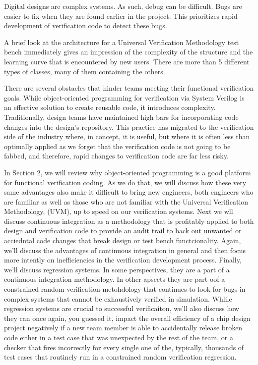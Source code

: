 \documentclass[twocolumn,letterpaper]{IEEEAerospaceCLS}  %
\begin{document}
Digital designs are complex systems. As such, debug can be difficult. Bugs are easier to fix when they are found earlier in the project. This prioritizes rapid development of verification code to detect these bugs.

A brief look at the architecture for a Universal Verification Methodology test bench immediately gives an impression of the complexity of the structure and the learning curve that is encountered by new users. There are more than 5 different types of classes, many of them containing the others.

There are several obstacles that hinder teams meeting their functional verification goals. While object-oriented programming for verification via System Verilog is an effective solution to create reusable code, it introduces complexity. Traditionally, design teams have maintained high bars for incorporating code changes into the design's repository. This practice has migrated to the verification side of the industry where, in concept, it is useful, but where it is often less than optimally applied as we forget that the verification code is not going to be fabbed, and therefore, rapid changes to verification code are far less risky. 

In Section 2, we will review why object-oriented programming is a good platform for functional verification coding. As we do that, we will discuss how these very same advantages also make it difficult to bring new engineers, both engineers who are familiar as well as those who are not familiar with the Universal Verification Methodology, (UVM), up to speed on our verification systems. Next we wll discuss continuous integration as a methodology that is profitably applied to both design and verification code to provide an audit trail to back out unwanted or acciedntal code changes that break design or test bench functcionality. Again, we'll discuss the   advantages of continuous integration in general and then focus more intently on inefficiencies in the verification development process. Finally, we'll discuss regression systems. In some perspectives, they are a part of a continuous integration methodology. In other apsects they are part oof a constrained random verification metohdology that continues to look for bugs in complex systems that cannot be exhaustively verified in simulation. Whlile regression systems are crucial to successful verificaiton, we'll also discuss how they can once again, you guessed it, impact the overall efficiency of a chip design project negatively if a new team member is able to accidentally release broken code either in a test case that was unexpected by the rest of the team, or a checker that fires incorrectly for every single one of the, typically, thousands of test cases that routinely run in a constrained random verification regression.
\end{document}
